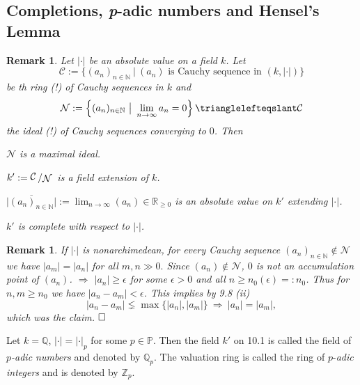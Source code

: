 \documentclass[11pt]{book}
\newtheorem{remark}[theorem]{Remark}
\theoremstyle{nonumberbreak}
\newenvironment{defin}[1][]{\ifthenelse{\equal{#1}{}}{\definition}{\definition[#1]}\rm}{\enddefinition}
\newenvironment{pr}[1][]{\ifthenelse{\equal{#1}{}}{\proof}{\proof[#1]}\rm}{\endproof}
\newcommand{\slant}[2]{{\raisebox{.1em}{$#1$}\left/\raisebox{-.1em}{$#2$}\right.}}
\begin{document}
\begin{spacing}{1.3}

\renewcommand*\thesection{§ \arabic{section}\quad }
\section{Completions, \textit{p}-adic numbers and Hensel's Lemma}
\renewcommand*\thesection{\arabic{section}}

\begin{remark} %
Let $|\cdot|$ be an absolute value on a field $k$. Let
$$\mathcal{C}:= \{(a_n)_{n \in \mathbb{N}} \ \big \vert \ (a_n) \textrm{ is Cauchy sequence in }(k, |\cdot |) \}$$
be th ring (!) of Cauchy sequences in $k$ and 
$$\mathcal{N}:= \left\{(a_n)_{n \in \mathbb{N}}\ \big\vert \ \lim_{n \to \infty}a_n=0\right\} \trianglelefteqslant \mathcal{C}$$
the ideal (!) of Cauchy sequences converging to $0$.
Then
\begin{compactenum}
\item $\mathcal{N}$ is a maximal ideal.
\item $k':=\slant{\mathcal{C}}{\mathcal{N}}$ is a field extension of $k$.
\item $\vert \overline{(a_n)_{n \in \mathbb{N}}} \vert := \lim_{n \to \infty} (a_n) \in \mathbb{R}_{\geqslant 0}$ is an absolute value on $k'$ extending $|\cdot|$.
\item $k'$ is complete with respect to $|\cdot|$.
\end{compactenum}
\end{remark}

\begin{remark}%
If $|\cdot|$ is nonarchimedean, for every Cauchy sequence $(a_n)_{n \in \mathbb{N}} \notin \mathcal{N}$ we have $|a_m|=|a_n|$ for all $m,n \gg 0.$
\begin{pr}
Since $(a_n) \notin \mathcal{N}$, $0$ is not an accumulation point of $(a_n)$.
$\Longrightarrow$ $|a_n| \geqslant \epsilon$ for some $\epsilon >0$ and all $n \geqslant n_0(\epsilon)=:n_0$.
Thus for $n,m \geqslant n_0$ we have $|a_n-a_m| < \epsilon$. This implies by 9.8 (ii)
$$|a_n-a_m| \lneq \max\{|a_n|, |a_m|\} \ \Longrightarrow \ |a_n|=|a_m|,$$
which was the claim. $\hfill \Box$
\end{pr}
\end{remark}

\begin{defin}%
Let $k=\mathbb{Q}$, $|\cdot|=|\cdot|_p$ for some $p \in \mathbb{P}$. Then the field $k'$ on 10.1 is called the field of $p$\textit{-adic numbers} and denoted by $\mathbb{Q}_p$. The valuation ring is called the ring of $p$-\textit{adic integers} and is denoted by $\mathbb{Z}_p$.
\end{defin}


\end{spacing}
\end{document}
